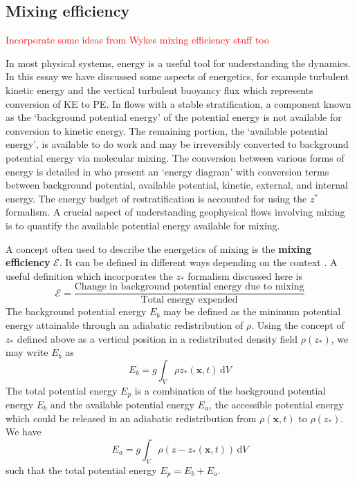 \documentclass[a4paper]{article}
\begin{document}
\subsection{Mixing efficiency}
\label{sec:energetics}
\textcolor{red}{Incorporate some ideas from Wykes mixing efficiency stuff too}

In most physical systems, energy is a useful tool for understanding the dynamics. In this essay we have
discussed some aspects of energetics, for example turbulent kinetic energy and the vertical turbulent buoyancy
flux which represents conversion of KE to PE. In flows with a stable stratification, a component known as the
`background potential energy' of the potential energy is not available for conversion to kinetic energy. The
remaining portion, the `available potential energy', is available to do work and may be irreversibly converted
to background potential energy via molecular mixing. The conversion between various forms of energy is
detailed in \citet{winters1995} who present an `energy diagram' with conversion terms between background
potential, available potential, kinetic, external, and internal energy. The energy budget of restratification
is accounted for using the $z^*$ formalism. A crucial aspect of understanding geophysical flows involving
mixing is to quantify the available potential energy available for mixing. 

A concept often used to describe the energetics of mixing is the \textbf{mixing efficiency} $\mathcal{E}$. It
can be defined in different ways depending on the context \citep{gregg2018}. A useful definition which
incorporates the $z_*$ formalism discussed here is
\begin{equation}
	\mathcal{E} = \frac{\text{Change in background potential energy due to mixing}}{\text{Total energy expended}}
\end{equation}
The background potential energy $E_b$ may be defined as the minimum potential energy attainable through an
adiabatic redistribution of $\rho$. Using the concept of $z_*$ defined above as a vertical position in a
redistributed density field $\rho(z_*)$, we may write $E_b$ as
\begin{equation}
	E_b = g \int_V \rho z_*(\bm{x},t)\,\mathrm{d}V
\end{equation}
The total potential energy $E_p$ is a combination of the background potential energy $E_b$ and the
available potential energy $E_a$, the accessible potential energy which could be released in an adiabatic
redistribution from $\rho(\bm{x},t)$ to $\rho(z_*)$. We have
\begin{equation}
	E_a = g \int_V \rho \left(z-z_*(\bm{x},t)\right)\,\mathrm{d}V
\end{equation}
such that the total potential energy $E_p = E_b + E_a$. 
\end{document}
